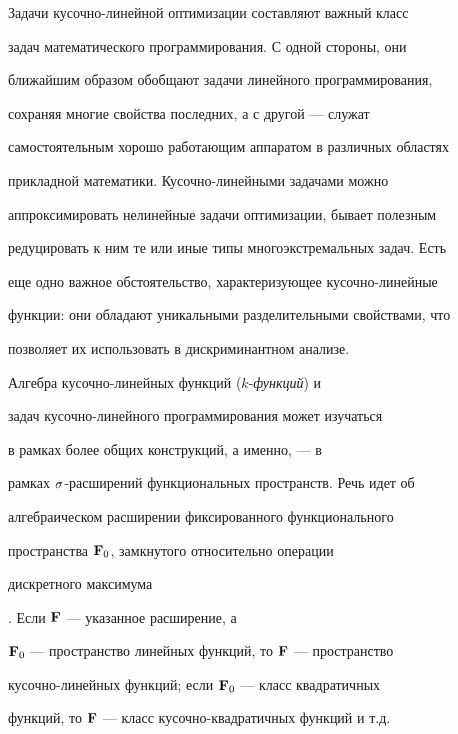  


\maketitle 


 


Задачи кусочно-линейной оптимизации составляют важный класс


задач математического программирования. С одной стороны, они


ближайшим образом обобщают задачи линейного программирования,


сохраняя многие свойства последних, а с другой --- служат


самостоятельным хорошо работающим аппаратом в различных областях


прикладной математики. Кусочно-линейными задачами можно


аппроксимировать нелинейные задачи оптимизации, бывает полезным


редуцировать к ним те или иные типы многоэкстремальных задач. Есть


еще одно важное обстоятельство, характеризующее кусочно-линейные


функции: они обладают уникальными разделительными свойствами, что


позволяет их использовать в дискриминантном анализе.





Алгебра кусочно-линейных функций ($k$-{\it функций}) и


задач кусочно-линейного программирования может изучаться


в рамках более общих конструкций, а именно, --- в


рамках $\sigma$-расширений функциональных пространств. Речь идет об


алгебраическом расширении фиксированного функционального


пространства $\bold F_0$, замкнутого относительно операции {\it


дискретного максимума}. Если $\bold F$ --- указанное расширение, а


$\bold F_0$ --- пространство линейных функций, то $\bold F$ --- пространство


кусочно-линейных функций; если $\bold F_0$ --- класс квадратичных


функций, то $\bold F$ --- класс кусочно-квадратичных функций и т.д.





